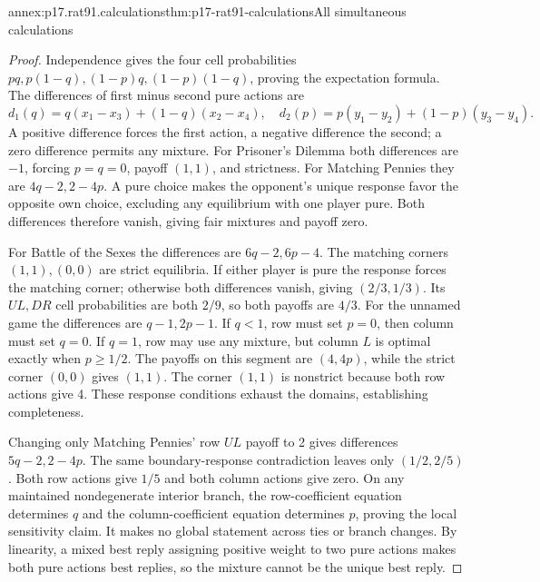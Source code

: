 \begin{annexitem}{annex:p17.rat91.calculations}{thm:p17-rat91-calculations}{All simultaneous calculations}
\begin{proof}
Independence gives the four cell probabilities
\(pq,p(1-q),(1-p)q,(1-p)(1-q)\), proving the expectation formula.
The differences of first minus second pure actions are
\[
 d_1(q)=q(x_1-x_3)+(1-q)(x_2-x_4),\quad
 d_2(p)=p(y_1-y_2)+(1-p)(y_3-y_4).
\]
A positive difference forces the first action, a negative difference
the second; a zero difference permits any mixture. For Prisoner's
Dilemma both differences are \(-1\), forcing \(p=q=0\),
payoff \((1,1)\), and strictness. For Matching Pennies they are
\(4q-2,2-4p\). A pure choice makes the opponent's unique response
favor the opposite own choice, excluding any equilibrium with one
player pure. Both differences therefore vanish, giving fair mixtures
and payoff zero.

For Battle of the Sexes the differences are \(6q-2,6p-4\).
The matching corners \((1,1),(0,0)\) are strict equilibria.
If either player is pure the response forces the matching corner;
otherwise both differences vanish, giving \((2/3,1/3)\).
Its \(UL,DR\) cell probabilities are both \(2/9\), so both
payoffs are \(4/3\). For the unnamed game the differences are
\(q-1,2p-1\). If \(q<1\), row must set \(p=0\),
then column must set \(q=0\). If \(q=1\), row may use any
mixture, but column \(L\) is optimal exactly when \(p\geq1/2\).
The payoffs on this segment are \((4,4p)\), while the strict
corner \((0,0)\) gives \((1,1)\). The corner \((1,1)\)
is nonstrict because both row actions give 4. These response
conditions exhaust the domains, establishing completeness.

Changing only Matching Pennies' row \(UL\) payoff to 2 gives
differences \(5q-2,2-4p\). The same boundary-response contradiction
leaves only \((1/2,2/5)\). Both row actions give \(1/5\) and
both column actions give zero. On any maintained nondegenerate
interior branch, the row-coefficient equation determines \(q\)
and the column-coefficient equation determines \(p\), proving
the local sensitivity claim. It makes no global statement across
ties or branch changes. By linearity, a mixed best reply assigning
positive weight to two pure actions makes both pure actions best
replies, so the mixture cannot be the unique best reply.
\end{proof}
\end{annexitem}

